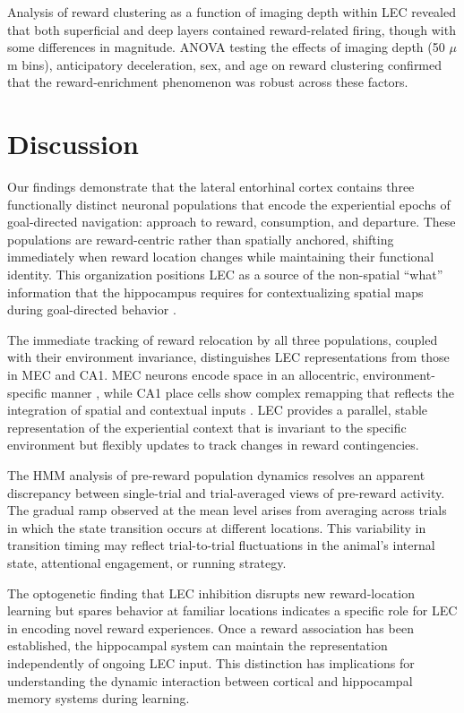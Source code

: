 \documentclass[12pt]{article}
\begin{document}
Analysis of reward clustering as a function of imaging depth within LEC revealed that both superficial and deep layers contained reward-related firing, though with some differences in magnitude. ANOVA testing the effects of imaging depth (50 $\mu$m bins), anticipatory deceleration, sex, and age on reward clustering confirmed that the reward-enrichment phenomenon was robust across these factors.

\section{Discussion}

Our findings demonstrate that the lateral entorhinal cortex contains three functionally distinct neuronal populations that encode the experiential epochs of goal-directed navigation: approach to reward, consumption, and departure. These populations are reward-centric rather than spatially anchored, shifting immediately when reward location changes while maintaining their functional identity. This organization positions LEC as a source of the non-spatial ``what'' information that the hippocampus requires for contextualizing spatial maps during goal-directed behavior \citep{rabinowitz2012constructing}.

The immediate tracking of reward relocation by all three populations, coupled with their environment invariance, distinguishes LEC representations from those in MEC and CA1. MEC neurons encode space in an allocentric, environment-specific manner \citep{hafting2005microstructure}, while CA1 place cells show complex remapping that reflects the integration of spatial and contextual inputs \citep{okeefe1971hippocampus}. LEC provides a parallel, stable representation of the experiential context that is invariant to the specific environment but flexibly updates to track changes in reward contingencies.

The HMM analysis of pre-reward population dynamics resolves an apparent discrepancy between single-trial and trial-averaged views of pre-reward activity. The gradual ramp observed at the mean level arises from averaging across trials in which the state transition occurs at different locations. This variability in transition timing may reflect trial-to-trial fluctuations in the animal's internal state, attentional engagement, or running strategy.

The optogenetic finding that LEC inhibition disrupts new reward-location learning but spares behavior at familiar locations indicates a specific role for LEC in encoding novel reward experiences. Once a reward association has been established, the hippocampal system can maintain the representation independently of ongoing LEC input. This distinction has implications for understanding the dynamic interaction between cortical and hippocampal memory systems during learning.
\end{document}

